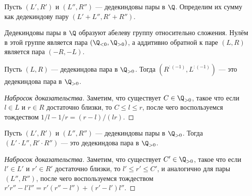 \documentclass[
	extrafontsizes,
	11pt,
	hyphens,
]{memoir}
\begin{document}
\begin{definition}
Пусть \((L',R')\) и \((L'',R'')\) --- дедекиндовы пары в \(\Q\).
Определим их сумму как дедекиндову пару
\((L' + L'', R' + R'')\).
\end{definition}

\begin{observation}
Дедекиндовы пары в \(\Q\) образуют абелеву группу относительно сложения.
\label{obs:DedPairAddGr}
Нулём в этой группе является пара
\((\Q_{<0}, \Q_{>0})\),
а аддитивно обратной к паре \((L,R)\) является пара \((-R,-L)\).
\end{observation}

\begin{lemma}
Пусть \((L,R)\) --- дедекиндова пара в \(\Q_{>0}\).
\label{lem:DedPairInv}
Тогда \((R^{:(-1)}, L^{:(-1)})\)
--- это дедекиндова пара в \(\Q_{>0}\).
\end{lemma}

\begin{proof}[Набросок доказательства]
Заметим, что существует \(C \in \Q_{>0}\), такое что если \(l \in L\) и \(r \in R\) достаточно близки, то \(C \leq l \leq r\),
после чего воспользуемся тождеством
\(1/l - 1/r = (r-l)/(lr)\).
\end{proof}

\begin{lemma}
\label{lem:DedPairProd}
Пусть \((L',R')\) и \((L'',R'')\) --- дедекиндовы пары в \(\Q_{>0}\).
Тогда \((L' \cdot L'', R' \cdot R'')\)
--- это дедекиндова пара в \(\Q_{>0}\).
\end{lemma}

\begin{proof}[Набросок доказательства]
Заметим, что существует \(C' \in \Q_{>0}\), такое что если \(l' \in L'\) и \(r' \in R'\) достаточно близки, то \(l' \leq r' \leq C'\), и аналогично для пары \((L'',R'')\),
после чего воспользуемся тождеством
\(
r' r'' - l' l'' =
r' (r'' - l'') +
(r' - l') l''
\).
\end{proof}
\end{document}
